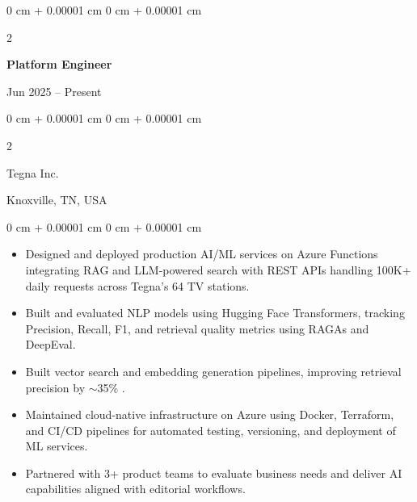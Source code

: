 \documentclass[10pt, letterpaper]{article}
\newenvironment{highlights}{
    \begin{itemize}[
        topsep=0.10 cm,
        parsep=0.10 cm,
        partopsep=0pt,
        itemsep=0pt,
        leftmargin=0 cm + 10pt
    ]
}{
    \end{itemize}
} %
\newenvironment{onecolentry}{
    \begin{adjustwidth}{
        0 cm + 0.00001 cm
    }{
        0 cm + 0.00001 cm
    }
}{
    \end{adjustwidth}
} %
\newenvironment{twocolentry}[2][]{
    \onecolentry
    \def\secondColumn{#2}
    \setcolumnwidth{\fill, 4.5 cm}
    \begin{paracol}{2}
}{
    \switchcolumn \raggedleft \secondColumn
    \end{paracol}
    \endonecolentry
} %
\begin{document}
    \begin{twocolentry}{Jun 2025 -- Present}
        \textbf{Platform Engineer}
    \end{twocolentry}
    \begin{twocolentry}{Knoxville, TN, USA}
       Tegna Inc.
    \end{twocolentry}
    
    \begin{onecolentry}
        \begin{highlights}
            \item Designed and deployed production AI/ML services on Azure Functions integrating RAG and LLM-powered search with REST APIs handling 100K+ daily requests across Tegna's 64 TV stations.
            \item Built and evaluated NLP models using Hugging Face Transformers, tracking Precision, Recall, F1, and retrieval quality metrics using RAGAs and DeepEval.
            \item Built vector search and embedding generation pipelines, improving retrieval precision by $\sim$35\% .
            \item Maintained cloud-native infrastructure on Azure using Docker, Terraform, and CI/CD pipelines for automated testing, versioning, and deployment of ML services.
            \item Partnered with 3+ product teams to evaluate business needs and deliver AI capabilities aligned with editorial workflows.
        \end{highlights}
    \end{onecolentry}

\vspace{1mm}
    
\end{document}
